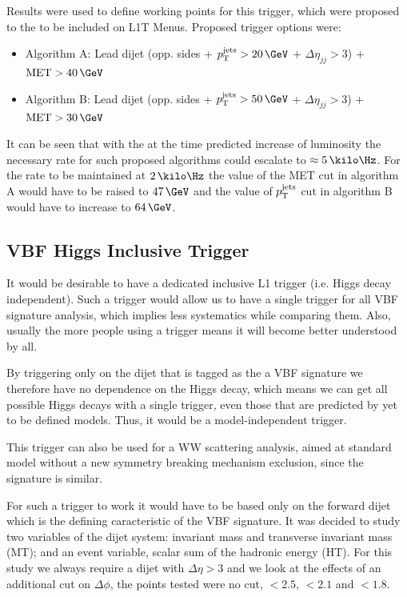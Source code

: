 Results were used to define working points for this trigger, which were proposed to the 
to be included on \gls{L1T} Menus. Proposed trigger options were:
\begin{itemize}
\item Algorithm A: Lead dijet (opp. sides + $\pt^{\text{jets}}>20\,\GeV$ + $\Delta\eta_{jj}>3$) + $\text{MET}>40\,\GeV$
\item Algorithm B: Lead dijet (opp. sides + $\pt^{\text{jets}}>50\,\GeV$ + $\Delta\eta_{jj}>3$) + $\text{MET}>30\,\GeV$
\end{itemize}

It can be seen that with the at the time predicted increase of luminosity the necessary rate for such proposed algorithms could escalate to $\approx 5\,\kilo\Hz$. For the rate to be maintained at $2\,\kilo\Hz$ the value of the MET cut in algorithm A would have to be raised to $47\,\GeV$ and the value of $p_{\mathrm{T}}^{\text{jets}}$ cut in algorithm B would have to increase to $64\,\GeV$.

\subsection{VBF Higgs Inclusive Trigger}
\label{SUBSECTION:ParkedDataAnalysis_ParkedTriggerDevelopment_InclusiveHiggsTrigger}

It would be desirable to have a dedicated inclusive L1 trigger (i.e. Higgs decay independent). Such a trigger
would allow us to have a single trigger for all VBF signature analysis, which implies less systematics
while comparing them. Also, usually the more people using a trigger means it will become better understood by all.

By triggering only on the dijet that is tagged as the a VBF signature we therefore have no dependence on the Higgs 
decay, which means we can get all possible Higgs decays with a single trigger, even those that are predicted by 
yet to be defined models. Thus, it would be a model-independent trigger.

This trigger can also be used for a WW scattering analysis, aimed at standard model without a new symmetry 
breaking mechanism exclusion, since the signature is similar.

For such a trigger to work it would have to be based only on the forward dijet which is the defining caracteristic
of the VBF signature.
It was decided to study two variables of the dijet system: invariant mass and transverse invariant mass (MT); and an event 
variable, scalar sum of the hadronic energy (HT). For this study we always require a dijet with $\Delta\eta>3$ and we 
look at the effects of an additional cut on $\Delta\phi$, the points tested were no cut, $<2.5$, $<2.1$ and $<1.8$.

